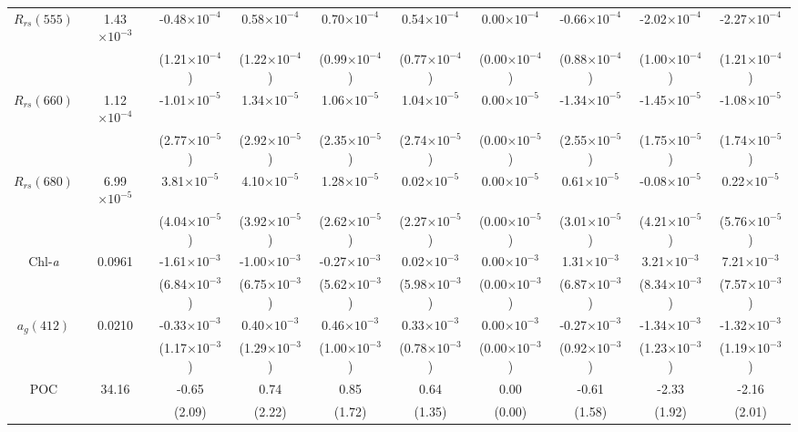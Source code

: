 \documentclass[preview]{standalone}
\begin{document}
\begin{threeparttable}
\begin{tabular}{cccccccccc}
$R_{rs}(555)$ & 1.43$\times10^{-3}$	&-0.48$\times10^{-4}$  	&  0.58$\times10^{-4}$  	&  0.70$\times10^{-4}$  	&  0.54$\times10^{-4}$  	&  0.00$\times10^{-4}$  	& -0.66$\times10^{-4}$  	& -2.02$\times10^{-4}$  	& -2.27$\times10^{-4}$ \\
			  &						& (1.21$\times10^{-4}$)	& (1.22$\times10^{-4}$) 	& (0.99$\times10^{-4}$) 	& (0.77$\times10^{-4}$) 	& (0.00$\times10^{-4}$) 	& (0.88$\times10^{-4}$) 	& (1.00$\times10^{-4}$) 	& (1.21$\times10^{-4}$) \\ \hline
$R_{rs}(660)$ & 1.12$\times10^{-4}$	&-1.01$\times10^{-5}$ 	&   1.34$\times10^{-5}$ 	&   1.06$\times10^{-5}$ 	&   1.04$\times10^{-5}$ 	&   0.00$\times10^{-5}$ 	&  -1.34$\times10^{-5}$ 	&  -1.45$\times10^{-5}$ 	&  -1.08$\times10^{-5}$ \\
			  &						&(2.77$\times10^{-5}$) 	& (2.92$\times10^{-5}$) 	& (2.35$\times10^{-5}$) 	& (2.74$\times10^{-5}$) 	& (0.00$\times10^{-5}$) 	& (2.55$\times10^{-5}$) 	& (1.75$\times10^{-5}$) 	& (1.74$\times10^{-5}$) \\ \hline
$R_{rs}(680)$ & 6.99$\times10^{-5}$	& 3.81$\times10^{-5}$ 	&   4.10$\times10^{-5}$ 	&   1.28$\times10^{-5}$ 	&   0.02$\times10^{-5}$ 	&   0.00$\times10^{-5}$ 	&   0.61$\times10^{-5}$ 	&  -0.08$\times10^{-5}$ 	&   0.22$\times10^{-5}$ \\
			  &						& (4.04$\times10^{-5}$)	& (3.92$\times10^{-5}$) 	& (2.62$\times10^{-5}$) 	& (2.27$\times10^{-5}$) 	& (0.00$\times10^{-5}$) 	& (3.01$\times10^{-5}$) 	& (4.21$\times10^{-5}$) 	& (5.76$\times10^{-5}$) \\ \hline
Chl-\it{a}    & 0.0961 				&-1.61$\times10^{-3}$ 	&  -1.00$\times10^{-3}$ 	&  -0.27$\times10^{-3}$ 	&   0.02$\times10^{-3}$ 	&   0.00$\times10^{-3}$ 	&   1.31$\times10^{-3}$ 	&   3.21$\times10^{-3}$ 	&   7.21$\times10^{-3}$ \\ 
	  		  &						& (6.84$\times10^{-3}$)	&  (6.75$\times10^{-3}$) 	&  (5.62$\times10^{-3}$) 	&  (5.98$\times10^{-3}$) 	&  (0.00$\times10^{-3}$) 	&  (6.87$\times10^{-3}$) 	&  (8.34$\times10^{-3}$) 	&  (7.57$\times10^{-3}$) \\ \hline
$a_{g}(412)$  & 0.0210 				&-0.33$\times10^{-3}$ 	&   0.40$\times10^{-3}$ 	&   0.46$\times10^{-3}$ 	&   0.33$\times10^{-3}$ 	&   0.00$\times10^{-3}$ 	&  -0.27$\times10^{-3}$ 	&  -1.34$\times10^{-3}$ 	&  -1.32$\times10^{-3}$ \\ 
			  &						& (1.17$\times10^{-3}$)	&  	(1.29$\times10^{-3}$) 	&  (1.00$\times10^{-3}$) 	&  (0.78$\times10^{-3}$) 	&  (0.00$\times10^{-3}$) 	&  (0.92$\times10^{-3}$) 	&  (1.23$\times10^{-3}$) 	&  (1.19$\times10^{-3}$) \\ \hline
POC		      & 34.16 				& -0.65 				&    0.74 					&    0.85 					&    0.64 					&    0.00 					&   -0.61 					&   -2.33 					&   -2.16 \\ 
			  &						&   (2.09) 				&   (2.22) 					&   (1.72) 					&   (1.35) 					&   (0.00) 					&   (1.58) 					&   (1.92) 					&   (2.01) \\ \hline


\end{tabular}
\end{threeparttable}
\end{document}
